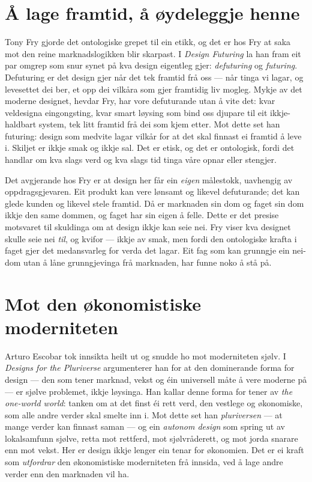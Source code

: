 \section{Å lage framtid, å øydeleggje henne}

Tony Fry gjorde det ontologiske grepet til ein etikk, og det er hos Fry at saka mot den reine marknadslogikken blir skarpast. I \emph{Design Futuring} \autocite{fry2009} la han fram eit par omgrep som snur synet på kva design eigentleg gjer: \emph{defuturing} og \emph{futuring}. Defuturing er det design gjer når det tek framtid frå oss — når tinga vi lagar, og levesettet dei ber, et opp dei vilkåra som gjer framtidig liv mogleg. Mykje av det moderne designet, hevdar Fry, har vore defuturande utan å vite det: kvar veldesigna eingongsting, kvar smart løysing som bind oss djupare til eit ikkje-haldbart system, tek litt framtid frå dei som kjem etter. Mot dette set han futuring: design som medvite lagar vilkår for at det skal finnast ei framtid å leve i. Skiljet er ikkje smak og ikkje sal. Det er etisk, og det er ontologisk, fordi det handlar om kva slags verd og kva slags tid tinga våre opnar eller stengjer.

Det avgjerande hos Fry er at design her får ein \emph{eigen} målestokk, uavhengig av oppdragsgjevaren. Eit produkt kan vere lønsamt og likevel defuturande; det kan glede kunden og likevel stele framtid. Då er marknaden sin dom og faget sin dom ikkje den same dommen, og faget har sin eigen å felle. Dette er det presise motsvaret til skuldinga om at design ikkje kan seie nei. Fry viser kva designet skulle seie nei \emph{til}, og kvifor — ikkje av smak, men fordi den ontologiske krafta i faget gjer det medansvarleg for verda det lagar. Eit fag som kan grunngje ein nei-dom utan å låne grunngjevinga frå marknaden, har funne noko å stå på.

\section{Mot den økonomistiske moderniteten}

Arturo Escobar tok innsikta heilt ut og snudde ho mot moderniteten sjølv. I \emph{Designs for the Pluriverse} \autocite{escobar2018pluriverse} argumenterer han for at den dominerande forma for design — den som tener marknad, vekst og éin universell måte å vere moderne på — er sjølve problemet, ikkje løysinga. Han kallar denne forma for tener av \emph{the one-world world}: tanken om at det finst éi rett verd, den vestlege og økonomiske, som alle andre verder skal smelte inn i. Mot dette set han \emph{pluriversen} — at mange verder kan finnast saman — og ein \emph{autonom design} som spring ut av lokalsamfunn sjølve, retta mot rettferd, mot sjølvråderett, og mot jorda snarare enn mot vekst. Her er design ikkje lenger ein tenar for økonomien. Det er ei kraft som \emph{utfordrar} den økonomistiske moderniteten frå innsida, ved å lage andre verder enn den marknaden vil ha.

